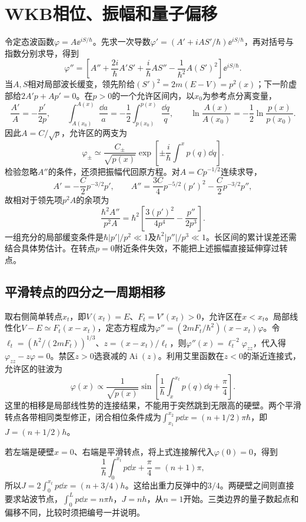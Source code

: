\section{WKB相位、振幅和量子偏移}
令定态波函数$\varphi=A\ee^{iS/\hbar}$。先求一次导数$\varphi'=(A'+iAS'/\hbar)\ee^{iS/\hbar}$，再对括号与指数分别求导，得到
\[
 \varphi''=\left[A''+\frac{2i}{\hbar}A'S'
 +\frac{i}{\hbar}AS''-\frac1{\hbar^2}A(S')^2\right]\ee^{iS/\hbar}.
\]
当$A,S$相对局部波长缓变，领先阶给$(S')^2=2m(E-V)=p^2(x)$；下一阶虚部给$2A'p+Ap'=0$。在$p>0$的一个允许区间内，以$x_0$为参考点分离变量，
\[
 \frac{A'}A=-\frac{p'}{2p},\qquad
 \int_{A(x_0)}^{A(x)}\frac{\dd a}{a}
 =-\frac12\int_{p(x_0)}^{p(x)}\frac{\dd q}{q},\qquad
 \ln\frac{A(x)}{A(x_0)}=-\frac12\ln\frac{p(x)}{p(x_0)}.
\]
因此$A=C/\sqrt p$，允许区的两支为
\[
 \varphi_\pm\simeq\frac{C_\pm}{\sqrt{p(x)}}
 \exp\left[\pm\frac i\hbar\int^x p(q)\dd q\right].
\]
检验忽略$A''$的条件，还须把振幅代回原方程。对$A=Cp^{-1/2}$连续求导，
\[
 A'=-\frac C2p^{-3/2}p',\qquad
 A''=\frac{3C}{4}p^{-5/2}(p')^2-\frac C2p^{-3/2}p'',
\]
故相对于领先项$p^2A$的余项为
\[
 \frac{\hbar^2A''}{p^2A}
 =\hbar^2\left[\frac{3(p')^2}{4p^4}-\frac{p''}{2p^3}\right].
\]
一组充分的局部缓变条件是$\hbar|p'|/p^2\ll1$及$\hbar^2|p''|/p^3\ll1$。长区间的累计误差还需结合具体势估计。在转点$p=0$附近条件失效，不能把上述振幅直接延伸穿过转点。

\subsection{平滑转点的四分之一周期相移}
取右侧简单转点$x_t$，即$V(x_t)=E$、$F_t=V'(x_t)>0$，允许区在$x<x_t$。局部线性化$V-E\simeq F_t(x-x_t)$，定态方程成为$\varphi''=(2mF_t/\hbar^2)(x-x_t)\varphi$。令$\ell_t=(\hbar^2/(2mF_t))^{1/3}$、$z=(x-x_t)/\ell_t$，则$\varphi''(x)=\ell_t^{-2}\varphi_{zz}$，代入得$\varphi_{zz}-z\varphi=0$。禁区$z>0$选衰减的$\operatorname{Ai}(z)$。利用艾里函数在$z<0$的渐近连接式，允许区的驻波为
\[
 \varphi(x)\propto\frac1{\sqrt{p(x)}}
 \sin\left[\frac1\hbar\int_x^{x_t}p(q)\dd q+\frac\pi4\right].
\]
这里的相移是局部线性势的连接结果，不能用于突然跳到无限高的硬壁。两个平滑转点各带相同类型修正，闭合相位条件成为$\int_{x_1}^{x_2}p\dd x=(n+1/2)\pi\hbar$，即$J=(n+1/2)h$。

若左端是硬壁$x=0$、右端是平滑转点，将上式连接解代入$\varphi(0)=0$，得到
\[
 \frac1\hbar\int_0^{x_t}p\dd x+\frac\pi4=(n+1)\pi,
\]
所以$J=2\int_0^{x_t}p\dd x=(n+3/4)h$。这给出重力反弹中的$3/4$。两硬壁之间则直接要求站波节点，$\int_0^Lp\dd x=n\pi\hbar$，$J=nh$，从$n=1$开始。三类边界的量子数起点和偏移不同，比较时须把编号一并说明。

